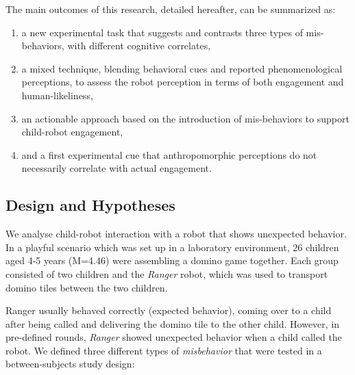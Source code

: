 \documentclass[letterpaper, 10pt, conference]{ieeeconf}
\begin{document}
The main outcomes of this research, detailed hereafter, can be summarized as:

\begin{enumerate}
    \item a new experimental task that suggests and contrasts three types of
        mis-behaviors, with different cognitive correlates,
    \item a mixed technique, blending behavioral cues and reported
        phenomenological perceptions, to assess the robot perception in terms of
        both engagement and human-likeliness,
    \item an actionable approach based on the introduction of mis-behaviors to support
        child-robot engagement,
    \item and a first experimental cue that anthropomorphic perceptions do not
        necessarily correlate with actual engagement.
\end{enumerate}


\subsection{Design and Hypotheses}

We analyse child-robot interaction with a robot that shows unexpected behavior.
In a playful scenario which was set up in a laboratory environment, 26 children
aged 4-5 years (M=4.46) were assembling a domino game together. Each group
consisted of two children and the \emph{Ranger} robot, which was used to
transport domino tiles between the two children.

Ranger usually behaved correctly (expected behavior), coming over to a child
after being called and delivering the domino tile to the other child. However,
in pre-defined rounds, \emph{Ranger} showed unexpected behavior when a child called the
robot. We defined three different types of \textit{misbehavior} that were tested
in a between-subjects study design:
\end{document}
